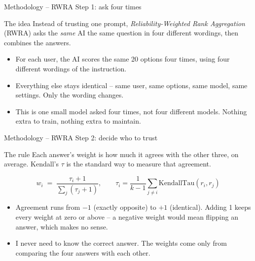 \documentclass[aspectratio=169,12pt]{beamer}
\begin{document}
\begin{frame}{Methodology -- RWRA Step 1: ask four times}
\begin{block}{The idea}
Instead of trusting one prompt, \emph{Reliability-Weighted Rank
Aggregation} (RWRA) asks the \emph{same} AI the same question in four
different wordings, then combines the answers.
\end{block}

\vspace{0.7em}
\begin{itemize}
  \item For each user, the AI scores the same 20 options four times, using
        four different wordings of the instruction.
  \item Everything else stays identical -- same user, same options, same
        model, same settings. Only the wording changes.
  \item This is one small model asked four times, not four different
        models. Nothing extra to train, nothing extra to maintain.
\end{itemize}
\end{frame}

\begin{frame}{Methodology -- RWRA Step 2: decide who to trust}
\begin{block}{The rule}
Each answer's weight is how much it agrees with the other three, on
average. Kendall's $\tau$ is the standard way to measure that agreement.
\end{block}

\vspace{0.8em}
\[
w_i \;=\; \frac{\tau_i + 1}{\sum_j (\tau_j + 1)}, \qquad
\tau_i = \frac{1}{k-1}\sum_{j \neq i} \mathrm{KendallTau}(r_i, r_j)
\]

\vspace{0.8em}
\begin{itemize}
  \item Agreement runs from $-1$ (exactly opposite) to $+1$ (identical).
        Adding 1 keeps every weight at zero or above -- a negative weight
        would mean flipping an answer, which makes no sense.
  \item I never need to know the correct answer. The weights come only
        from comparing the four answers with each other.
\end{itemize}
\end{frame}
\end{document}
